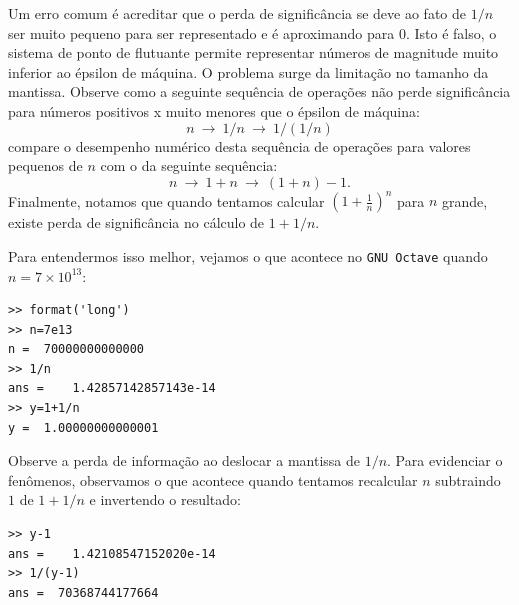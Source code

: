 \begin{ex}
Um erro comum é acreditar que o perda de significância se deve ao fato de $1/n$ ser muito pequeno para ser representado e é aproximando para $0$. Isto é falso, o sistema de ponto de flutuante permite representar números de magnitude muito inferior ao épsilon de máquina. O problema surge da limitação no tamanho da mantissa. Observe como a seguinte sequência de operações não perde significância para números positivos x muito menores que o épsilon de máquina:
\begin{equation}\label{seq_oper2}
n ~\to ~1/n ~\to ~1/(1/n)
\end{equation}
compare o desempenho numérico desta sequência de operações para valores pequenos de $n$ com o da seguinte sequência:
\begin{equation}\label{seq_oper3}
n ~\to ~1+n ~\to ~(1+n)-1.
\end{equation}
Finalmente, notamos que quando tentamos calcular $\left(1+\frac{1}{n}\right)^n$ para $n$ grande, existe perda de significância no cálculo de $1+1/n$.

Para entendermos isso melhor, vejamos o que acontece no \verb+GNU Octave+ quando $n=7\times 10^{13}$:
\begin{verbatim}
>> format('long')
>> n=7e13
n =  70000000000000
>> 1/n
ans =    1.42857142857143e-14
>> y=1+1/n
y =  1.00000000000001
\end{verbatim}
Observe a perda de informação ao deslocar a mantissa de $1/n$. Para evidenciar o fenômenos, observamos o que acontece quando tentamos recalcular $n$ subtraindo $1$ de $1+1/n$ e invertendo o resultado:
\begin{verbatim}
>> y-1
ans =    1.42108547152020e-14
>> 1/(y-1)
ans =  70368744177664
\end{verbatim}
\end{ex}

